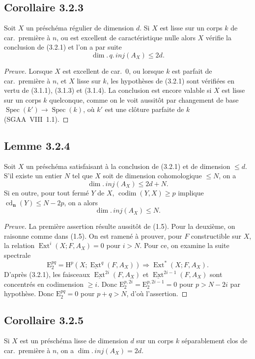 \documentclass[11pt]{article}
\DeclareMathOperator{\codim}{codim}
\renewcommand{\H}{\mathrm{H}}
\DeclareMathOperator{\Ext}{Ext}
\DeclareMathOperator{\Spec}{Spec}
\DeclareMathOperator{\cd}{cd}
\newcommand{\E}{\mathrm{E}}
\providecommand{\Spec}{\operatorname{Spec}}
\providecommand{\Spec}{\operatorname{Spec}}
\providecommand{\Spec}{\operatorname{Spec}}
\providecommand{\Spec}{\operatorname{Spec}}
\begin{document}
\subsection*{Corollaire 3.2.3}
Soit $X$ un préschéma régulier de dimension $d$. Si $X$ est lisse sur un corps $k$ de car.~première à $n$, ou est excellent de caractéristique nulle alors $X$ vérifie la conclusion de (3.2.1) et l'on a par suite
\[
\dim.\,q.\,inj(A_X) \leqslant 2d.
\]

\begin{proof}[Preuve]
Lorsque $X$ est excellent de car.~0, ou lorsque $k$ est parfait de car.~première à $n$, et $X$ lisse sur $k$, les hypothèses de (3.2.1) sont vérifiées en vertu de (3.1.1), (3.1.3) et (3.1.4). La conclusion est encore valable si $X$ est lisse sur un corps $k$ quelconque, comme on le voit aussitôt par changement de base $\Spec(k') \to \Spec(k)$, où $k'$ est une clôture parfaite de $k$ (SGAA~VIII~1.1).
\end{proof}

\subsection*{Lemme 3.2.4}
Soit $X$ un préschéma satisfaisant à la conclusion de (3.2.1) et de dimension $\leqslant d$. S'il existe un entier $N$ tel que $X$ soit de dimension cohomologique $\leqslant N$, on a
\[
\dim.\,inj(A_X) \leqslant 2d + N.
\]
Si en outre, pour tout fermé $Y$ de $X$, $\codim(Y,X) \geqslant p$ implique $\cd_{\mathbf{n}}(Y) \leqslant N - 2p$, on a alors
\[
\dim.\,inj(A_X) \leqslant N.
\]

\begin{proof}[Preuve]
La première assertion résulte aussitôt de (1.5). Pour la deuxième, on raisonne comme dans (1.5). On est ramené à prouver, pour $F$ constructible sur $X$, la relation $\Ext^i(X; F, A_X) = 0$ pour $i > N$. Pour ce, on examine la suite spectrale
\[
\E_2^{pq} = \H^p(X; \underline{\Ext}^q(F, A_X)) \Rightarrow \Ext^{*}(X; F, A_X).
\]
D'après (3.2.1), les faisceaux $\underline{\Ext}^{2i}(F, A_X)$ et $\underline{\Ext}^{2i-1}(F, A_X)$ sont concentrés en codimension $\geqslant i$. Donc $\E_2^{p,2i} = \E_2^{p,2i-1} = 0$ pour $p > N - 2i$ par hypothèse. Donc $\E_2^{pq} = 0$ pour $p+q > N$, d'où l'assertion.
\end{proof}

\subsection*{Corollaire 3.2.5}
Si $X$ est un préschéma lisse de dimension $d$ sur un corps $k$ séparablement clos de car.~première à $n$, on a $\dim.\,inj(A_X) = 2d$.
\end{document}
